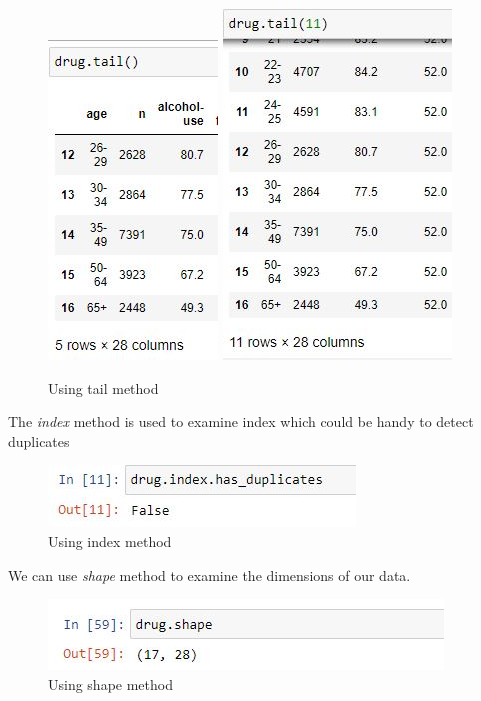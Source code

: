 \begin{figure}[ht]
	\centering
	\includegraphics{Assets/Images/Pandas/tail}
	\includegraphics{Assets/Images/Pandas/tail11}
	\caption{Using tail method}
	\label{fig:tail}
\end{figure}

\newpage
\noindent The \textit{index} method is used to examine index which could be handy to detect duplicates

\begin{figure}[ht]
	\centering
	\includegraphics{Assets/Images/Pandas/index_duplicates}
	\caption{Using index method}
	\label{fig:index}
\end{figure}

\noindent We can use \textit{shape} method to examine the dimensions of our data.

\begin{figure}[ht]
	\centering
	\includegraphics{Assets/Images/Pandas/shape}
	\caption{Using shape method}
	\label{fig:index}
\end{figure}